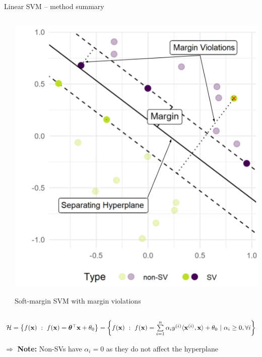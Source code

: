 \begin{vbframe}{Linear SVM -- method summary}
\begin{columns}[T]
\begin{column}{0.7\linewidth}
\medskip

\\

\end{column}
\begin{column}{0.3\linewidth}
    
  \includegraphics[width=\linewidth]{figure/svm_wording.png} \\
  \begin{center}
  \tiny{Soft-margin SVM with margin violations}
  \end{center}
\end{column}
\end{columns}


$
\Hspace = \left\{\fx ~:~\fx = \thetab^\top \xv + \theta_0 \right\} %
= \left \{\fx ~:~ \fx = \sumin \alpha_i \yi \langle \xi, \xv \rangle  + \theta_0 ~|~ \alpha_i \geq 0, \forall i \right \}$

$\Rightarrow$ \textbf{Note:} Non-SVs have $\alpha_i = 0$ as they do not affect the hyperplane


\framebreak


\end{vbframe}
